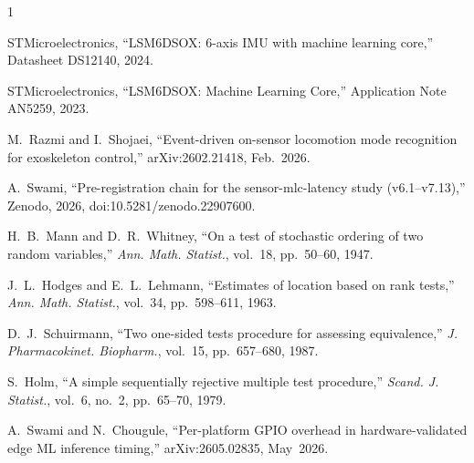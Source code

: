 \documentclass{IEEE_lsens}
\begin{document}
\begin{thebibliography}{1}

 STMicroelectronics, ``LSM6DSOX: 6-axis IMU with machine learning core,'' Datasheet DS12140, 2024.

 STMicroelectronics, ``LSM6DSOX: Machine Learning Core,'' Application Note AN5259, 2023.

 M.~Razmi and I.~Shojaei, ``Event-driven on-sensor locomotion mode recognition for exoskeleton control,'' arXiv:2602.21418, Feb.\ 2026.

 A.~Swami, ``Pre-registration chain for the sensor-mlc-latency study (v6.1--v7.13),'' Zenodo, 2026, doi:10.5281/zenodo.22907600.

 H.~B.~Mann and D.~R.~Whitney, ``On a test of stochastic ordering of two random variables,'' \emph{Ann. Math. Statist.}, vol.~18, pp.~50--60, 1947.

 J.~L.~Hodges and E.~L.~Lehmann, ``Estimates of location based on rank tests,'' \emph{Ann. Math. Statist.}, vol.~34, pp.~598--611, 1963.

 D.~J.~Schuirmann, ``Two one-sided tests procedure for assessing equivalence,'' \emph{J. Pharmacokinet. Biopharm.}, vol.~15, pp.~657--680, 1987.

 S.~Holm, ``A simple sequentially rejective multiple test procedure,'' \emph{Scand. J. Statist.}, vol.~6, no.~2, pp.~65--70, 1979.

 A.~Swami and N.~Chougule, ``Per-platform GPIO overhead in hardware-validated edge ML inference timing,'' arXiv:2605.02835, May~2026.

\end{thebibliography}
\end{document}
